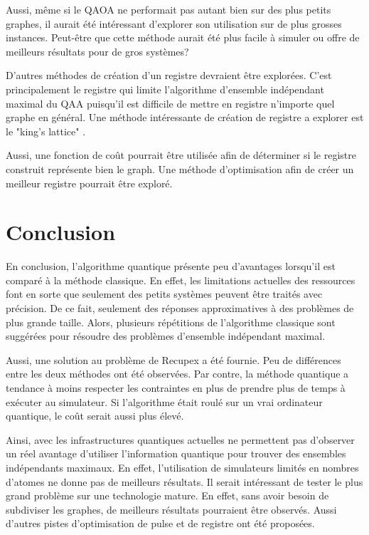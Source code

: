 \documentclass[11pt]{article}
\begin{document}
Aussi, même si le QAOA ne performait pas autant bien sur des plus petits graphes, il aurait été intéressant d'explorer son utilisation sur de plus grosses instances. Peut-être que cette méthode aurait été plus facile à simuler ou offre de meilleurs résultats pour de gros systèmes?

D'autres méthodes de création d'un registre devraient être explorées. C'est principalement le registre qui limite l'algorithme d'ensemble indépendant maximal du QAA puisqu'il est difficile de mettre en registre n'importe quel graphe en général. Une méthode intéressante de création de registre a explorer est le "king's lattice" \cite{kim_quantum_2023}.

Aussi, une fonction de coût pourrait être utilisée afin de déterminer si le registre construit représente bien le graph. Une méthode d'optimisation afin de créer un meilleur registre pourrait être exploré.


\section{Conclusion}
En conclusion, l'algorithme quantique présente peu d’avantages lorsqu'il est comparé à la méthode classique. En effet, les limitations actuelles des ressources font en sorte que seulement des petits systèmes peuvent être traités avec précision. De ce fait, seulement des réponses approximatives à des problèmes de plus grande taille. Alors, plusieurs répétitions de l'algorithme classique sont suggérées pour résoudre des problèmes d'ensemble indépendant maximal. 

Aussi, une solution au problème de Recupex a été fournie. Peu de différences entre les deux méthodes ont été observées. Par contre, la méthode quantique a tendance à moins respecter les contraintes en plus de prendre plus de temps à exécuter au simulateur. Si l'algorithme était roulé sur un vrai ordinateur quantique, le coût serait aussi plus élevé.

Ainsi, avec les infrastructures quantiques actuelles ne permettent pas d'observer un réel avantage d'utiliser l'information quantique pour trouver des ensembles indépendants maximaux. En effet, l'utilisation de simulateurs limités en nombres d'atomes ne donne pas de meilleurs résultats. Il serait intéressant de tester le plus grand problème sur une technologie mature. En effet, sans avoir besoin de subdiviser les graphes, de meilleurs résultats pourraient être observés. Aussi d'autres pistes d'optimisation de pulse et de registre ont été proposées.
\end{document}
